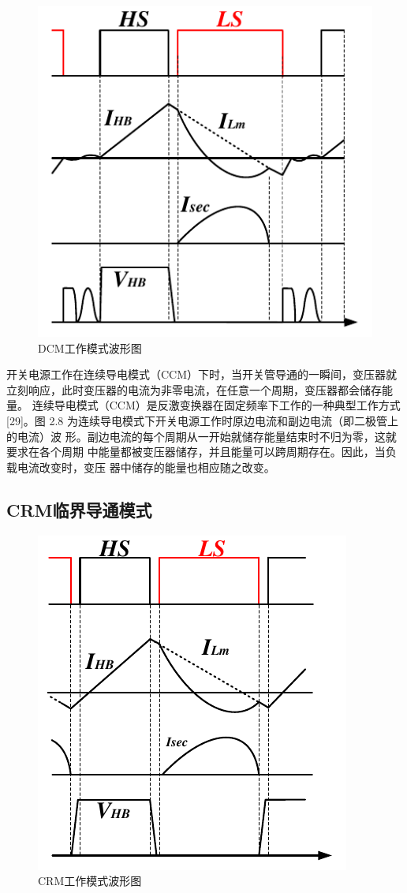 \begin{figure}[htbp] 
    \centering
    \includegraphics[width=0.8\linewidth]{figures/DCM模式.pdf}
    \caption{DCM工作模式波形图}
    \label{fig:DCM工作模式波形图}
\end{figure}

开关电源工作在连续导电模式（CCM）下时，当开关管导通的一瞬间，变压器就 立刻响应，此时变压器的电流为非零电流，在任意一个周期，变压器都会储存能量。 连续导电模式（CCM）是反激变换器在固定频率下工作的一种典型工作方式[29]。图 2.8 为连续导电模式下开关电源工作时原边电流和副边电流（即二极管上的电流）波 形。副边电流的每个周期从一开始就储存能量结束时不归为零，这就要求在各个周期 中能量都被变压器储存，并且能量可以跨周期存在。因此，当负载电流改变时，变压 器中储存的能量也相应随之改变。

\subsection{CRM临界导通模式}

\begin{figure}[htbp] 
    \centering
    \includegraphics[width=0.8\linewidth]{figures/CRM模式.pdf}
    \caption{CRM工作模式波形图}
    \label{fig:CRM工作模式波形图}
\end{figure}

